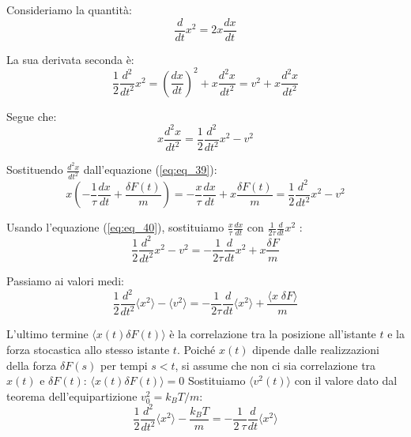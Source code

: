 Consideriamo la quantità:
\begin{equation} 
\label{eq:eq_40}
\frac{d}{dt} x^2  = 2  x \frac{dx}{dt} 
\end{equation}

La sua derivata seconda è:
\begin{equation}
\frac{1}{2} \frac{d^2}{dt^2}  x^2  = \left( \frac{dx}{dt} \right)^2 + x \frac{d^2x}{dt^2} = v^2 + x \frac{d^2x}{dt^2}
\end{equation}

Segue che:
\begin{equation}
x \frac{d^2x}{dt^2} = \frac{1}{2} \frac{d^2}{dt^2}  x^2  - v^2
\end{equation}

Sostituendo $\frac{d^2x}{dt^2}$ dall'equazione (\ref{eq:eq_39}):
\begin{equation}
x \left( - \frac{1}{\tau} \frac{dx}{dt}  + \frac{\delta F(t)}{m}\right) = - \frac{x}{\tau} \frac{dx}{dt}  + x \frac{\delta F(t)}{m}= \frac{1}{2} \frac{d^2}{dt^2}  x^2  - v^2
\end{equation}

Usando l'equazione (\ref{eq:eq_40}), sostituiamo $\frac{x}{\tau} \frac{dx}{dt}$ con  $\frac{1}{2 \tau} \frac{d}{dt} x^2$ :
\begin{equation}
\frac{1}{2} \frac{d^2}{dt^2}  x^2  - v^2  = - \frac{1}{2 \tau} \frac{d}{dt} x^2  + x \frac{\delta F}{m}
\end{equation}

Passiamo ai valori medi:
\begin{equation}
\frac{1}{2} \frac{d^2}{dt^2} \langle x^2 \rangle - \langle v^2 \rangle = - \frac{1}{2 \tau} \frac{d}{dt} \langle x^2 \rangle +  \frac{\langle x \;\delta F \rangle}{m}
\end{equation}

L'ultimo termine $\langle x(t) \delta F(t) \rangle$ è la correlazione tra la posizione all'istante $t$ e la forza stocastica allo stesso istante $t$. Poiché $x(t)$ dipende dalle realizzazioni della forza $\delta F(s)$ per tempi $s < t$, si assume che non ci sia correlazione tra $x(t)$ e $\delta F(t)$: $\langle x(t) \delta F(t) \rangle = 0$
Sostituiamo $\langle v^2(t) \rangle$ con il valore dato dal teorema dell’equipartizione $v_0^2=k_B T/m$:
\begin{equation}
\label{eq:eq_46}
\frac{1}{2}  \frac{d^2}{dt^2} \langle x^2 \rangle - \frac{k_B T}{m} =- \frac{1}{2 \:\tau} \frac{d}{dt} \langle x^2 \rangle
\end{equation}

